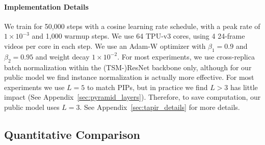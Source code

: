 \documentclass[10pt,twocolumn,letterpaper]{article}
\begin{document}
\paragraph{Implementation Details}
We train for 50,000 steps with a cosine learning rate schedule, with a peak rate of $1\times10^{-3}$ and 1,000 warmup steps.  We use 64 TPU-v3 cores, using 4 24-frame videos per core in each step. We use an Adam-W optimizer with $\beta_1=0.9$ and $\beta_2=0.95$ and weight decay $1\times10^{-2}$. For most experiments, we use cross-replica batch normalization within the (TSM-)ResNet backbone only, although for our public model we find instance normalization is actually more effective.  For most experiments we use $L=5$ to match PIPs, but in practice we find $L>3$ has little impact (See Appendix~\ref{sec:pyramid_layers}).  Therefore, to save computation, our public model uses $L=3$. See Appendix~\ref{sec:tapir_details} for more details. 


\subsection{Quantitative Comparison}
\end{document}
